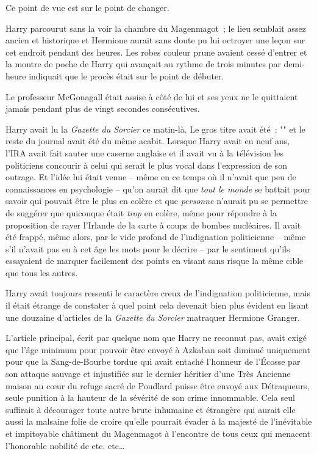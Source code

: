 Ce point de vue est sur le point de changer.

\later

Harry parcourut sans la voir la chambre du Magenmagot~; le lieu semblait assez ancien et historique et Hermione aurait sans doute pu lui octroyer une leçon sur cet endroit pendant des heures. Les robes couleur prune avaient cessé d'entrer et la montre de poche de Harry qui avançait au rythme de trois minutes par demi-heure indiquait que le procès était sur le point de débuter.

Le professeur McGonagall était assise à côté de lui et ses yeux ne le quittaient jamais pendant plus de vingt secondes consécutives.

Harry avait lu la \emph{Gazette du Sorcier} ce matin-là. Le gros titre avait été~: "" et le reste du journal avait été du même acabit. Lorsque Harry avait eu neuf ans, l'IRA avait fait sauter une caserne anglaise et il avait vu à la télévision les politiciens concourir à celui qui serait le plus vocal dans l'expression de son outrage. Et l'idée lui était venue -- même en ce temps où il n'avait que peu de connaissances en psychologie -- qu'on aurait dit que \emph{tout le monde} se battait pour savoir qui pouvait être le plus en colère et que \emph{personne} n'aurait pu se permettre de suggérer que quiconque était \emph{trop} en colère, même pour répondre à la proposition de rayer l'Irlande de la carte à coups de bombes nucléaires. Il avait été frappé, même alors, par le vide profond de l'indignation politicienne -- même s'il n'avait pas eu à cet âge les mots pour le décrire -- par le sentiment qu'ils essayaient de marquer facilement des points en visant sans risque la même cible que tous les autres.

Harry avait toujours ressenti le caractère creux de l'indignation politicienne, mais il était étrange de constater à quel point cela devenait bien plus évident en lisant une douzaine d'articles de la \emph{Gazette du Sorcier} matraquer Hermione Granger.

L'article principal, écrit par quelque nom que Harry ne reconnut pas, avait exigé que l'âge minimum pour pouvoir être envoyé à Azkaban soit diminué uniquement pour que la Sang-de-Bourbe tordue qui avait entaché l'honneur de l'Écosse par son attaque sauvage et injustifiée sur le dernier héritier d'une Très Ancienne maison au cœur du refuge sacré de Poudlard puisse être envoyé aux Détraqueurs, seule punition à la hauteur de la sévérité de son crime innommable. Cela seul suffirait à décourager toute autre brute inhumaine et étrangère qui aurait elle aussi la malsaine folie de croire qu'elle pourrait évader à la majesté de l'inévitable et impitoyable châtiment du Magenmagot à l'encontre de tous ceux qui menacent l'honorable nobilité de etc. etc…

